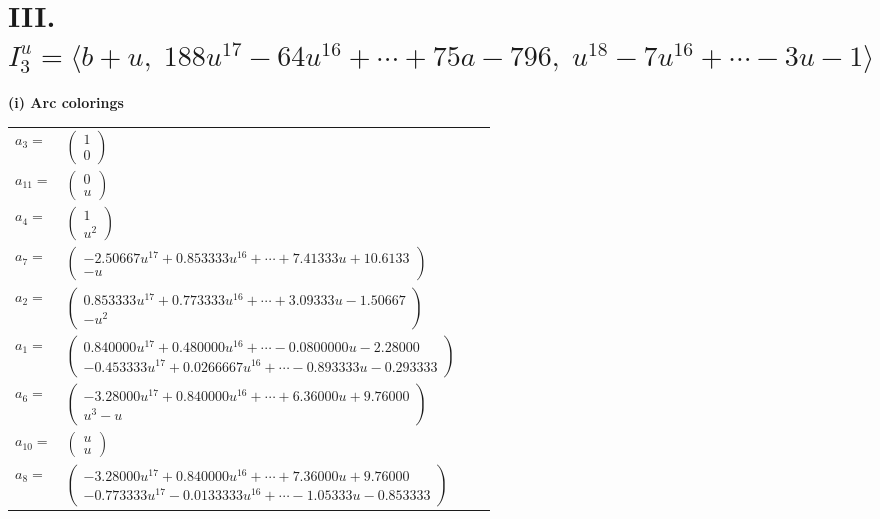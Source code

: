 \documentclass[1p]{elsarticle_modified}
\theoremstyle{definition}
\begin{document}
\centering \section*{III. $I^u_{3}= \langle b+u,\;188 u^{17}-64 u^{16}+\cdots+75 a-796,\;u^{18}-7 u^{16}+\cdots-3 u-1 \rangle$}
\flushleft \textbf{(i) Arc colorings}\\
\begin{tabular}{m{7pt} m{180pt} m{7pt} m{180pt} }
\flushright $a_{3}=$&$\begin{pmatrix}1\\0\end{pmatrix}$ \\
\flushright $a_{11}=$&$\begin{pmatrix}0\\u\end{pmatrix}$ \\
\flushright $a_{4}=$&$\begin{pmatrix}1\\u^2\end{pmatrix}$ \\
\flushright $a_{7}=$&$\begin{pmatrix}-2.50667 u^{17}+0.853333 u^{16}+\cdots+7.41333 u+10.6133\\- u\end{pmatrix}$ \\
\flushright $a_{2}=$&$\begin{pmatrix}0.853333 u^{17}+0.773333 u^{16}+\cdots+3.09333 u-1.50667\\- u^2\end{pmatrix}$ \\
\flushright $a_{1}=$&$\begin{pmatrix}0.840000 u^{17}+0.480000 u^{16}+\cdots-0.0800000 u-2.28000\\-0.453333 u^{17}+0.0266667 u^{16}+\cdots-0.893333 u-0.293333\end{pmatrix}$ \\
\flushright $a_{6}=$&$\begin{pmatrix}-3.28000 u^{17}+0.840000 u^{16}+\cdots+6.36000 u+9.76000\\u^3- u\end{pmatrix}$ \\
\flushright $a_{10}=$&$\begin{pmatrix}u\\u\end{pmatrix}$ \\
\flushright $a_{8}=$&$\begin{pmatrix}-3.28000 u^{17}+0.840000 u^{16}+\cdots+7.36000 u+9.76000\\-0.773333 u^{17}-0.0133333 u^{16}+\cdots-1.05333 u-0.853333\end{pmatrix}$ \\

\end{tabular}
\end{document}
